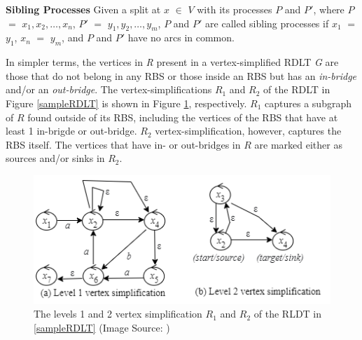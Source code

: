 \begin{defn}\textbf{Sibling Processes} \cite{Roca2024}
    \label{SibPro}
    Given a split at $ x $ $ \in $ $ V $ with its processes $ P $ and $ P' $, where $ P $ $ = $ $ x_1, x_2, \ldots, x_n $, $ P' $ $ = $ $ y_1, y_2, \ldots, y_m $, $ P $ and $ P' $ are called sibling processes if $ x_1 $ $ = $ $ y_1 $, $ x_n $ $ = $ $ y_m $, and $ P $ and $ P' $ have no arcs in common. 
\end{defn}

 In simpler terms, the vertices in \emph{R} present in a vertex-simplified RDLT \emph{G} are those that do not belong in any RBS or those inside an RBS but has an \emph{in-bridge} and/or an \emph{out-bridge}.
 The vertex-simplifications $R_1$ and $R_2$ of the RDLT in Figure \ref{sampleRDLT} is shown in Figure \ref{vertexSimplification}, respectively. $R_1$ captures a subgraph of $R$ found outside of its RBS, including the vertices of the RBS that have at least 1 in-brigde or out-bridge. $R_2$ vertex-simplification, however, captures the RBS itself. The vertices that have in- or out-bridges in $R$ are marked either as sources and/or sinks in $R_2$.
 \begin{figure}[H]
    \centering
    \includegraphics[]{../figures/vertexSimplification.png}
    \caption{The levels 1 and 2 vertex simplification $R_1$ and $R_2$ of the RLDT in \ref{sampleRDLT} (Image Source: \cite{MalinaoWCTP2023})}
    \label{vertexSimplification}
\end{figure}
